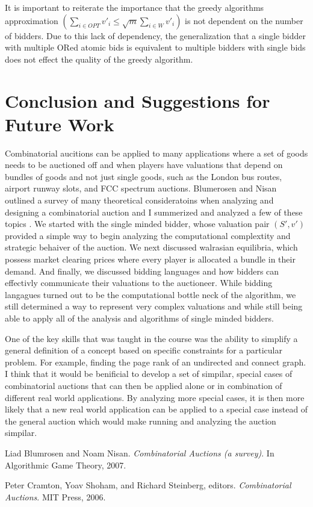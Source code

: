 \documentclass[10pt,onecolumn,letterpaper]{article}
\theoremstyle{definition}
\begin{document}
It is important to reiterate the importance that the greedy algorithms approximation $(\sum_{i \in OPT} v'_i \leq \sqrt{m} \sum_{i \in W} v'_i)$ is not dependent on the number of bidders. Due to this lack of dependency, the generalization that a single bidder with multiple ORed atomic bids is equivalent to multiple bidders with single bids does not effect the quality of the greedy algorithm.

\section{Conclusion and Suggestions for Future Work} %

Combinatorial aucitions can be applied to many applications where a set of goods needs to be auctioned off and when players have valuations that depend on bundles of goods and not just single goods, such as the London bus routes, airport runway slots, and FCC spectrum auctions. Blumerosen and Nisan outlined a survey of many theoretical consideratoins when analyzing and designing a combinatorial auction and I summerized and analyzed a few of these topics \cite{paper}. We started with the single minded bidder, whose valuation pair $(S',v')$ provided a simple way to begin analyzing the computational complextity and strategic behaiver of the auction. We next discussed walrasian equilibria, which possess market clearing prices where every player is allocated a bundle in their demand. And finally, we discussed bidding languages and how bidders can effectivly communicate their valuations to the auctioneer. While bidding langagues turned out to be the computational bottle neck of the algorithm, we still determined a way to represent very complex valuations and while still being able to apply all of the analysis and algorithms of single minded bidders.

One of the key skills that was taught in the course was the ability to simplify a general definition of a concept based on specific constraints for a particular problem. For example, finding the page rank of an undirected and connect graph. I think that it would be benificial to develop a set of simpilar, special cases of combinatorial auctions that can then be applied alone or in combination of different real world applications. By analyzing more special cases, it is then more likely that a new real world application can be applied to a special case instead of the general auction which would make running and analyzing the auction simpilar.

\begin{thebibliography}{0} %

Liad Blumrosen and Noam Nisan. 
\textit{Combinatorial Auctions (a survey)}. 
In Algorithmic Game Theory, 2007.
 
Peter Cramton, Yoav Shoham, and Richard Steinberg, editors.
\textit{Combinatorial Auctions}. 
MIT Press, 2006.
 
\end{thebibliography}
\end{document}
